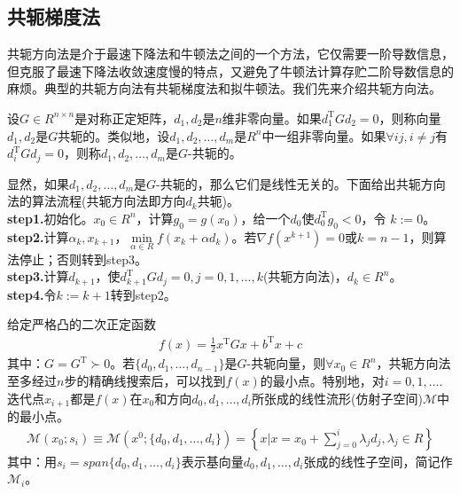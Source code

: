    \subsection{共轭梯度法}
        \par
        共轭方向法是介于最速下降法和牛顿法之间的一个方法，它仅需要一阶导数信息，但克服了最速下降法收敛速度慢的特点，又避免了牛顿法计算存贮二阶导数信息的麻烦。典型的共轭方向法有共轭梯度法和拟牛顿法。我们先来介绍共轭方向法。
        \par
        设$G \in R^{n \times n}$是对称正定矩阵，$d_1,d_2$是$n$维非零向量。如果$d_1^\mathrm{T}  G d_2 = 0$，则称向量$d_1,d_2$是$G$共轭的。类似地，设$d_1,d_2,\dots,d_m$是$R^n$中一组非零向量。如果$\forall ij,i \neq j$有$d_i^\mathrm{T} G d_j=0$，则称$d_1,d_2,\dots,d_m$是$G$-共轭的。
        \par
        显然，如果$d_1,d_2,\ldots,d_m$是$G$-共轭的，那么它们是线性无关的。下面给出共轭方向法的算法流程(共轭方向法即方向$d_k$共轭)。\\
        \textbf{step1.}初始化。$x_0\in R^n$，计算$g_0 = g(x_0)$，给一个$d_0$使$d_0^\mathrm{T}  g_0 <0$，令 $k:=0$。\\
        \textbf{step2.}计算${\alpha}_k,x_{k+1}$，$\mathop {\min} \limits_{\alpha \in R}f(x_k+\alpha d_k)$。若$
        \nabla f(x^{k+1})=0$或$k=n-1$，则算法停止；否则转到step3。\\
        \textbf{step3.}计算$d_{k+1}$，使$d_{k+1}^\mathrm{T}  G d_j=0,j=0,1,\ldots ,k$(共轭方向法)，$d_k \in R^n$。\\
        \textbf{step4.}令$k:=k+1$转到step2。
        \begin{lemma}[扩张子空间定理]
        给定严格凸的二次正定函数
        \begin{align*}
         f(x)=\frac 12 x^\mathrm{T} Gx+b^\mathrm{T} x+c
        \end{align*}
        其中：$G=G^\mathrm{T} \succ 0$。若$\{d_0,d_1,\ldots,d_{n-1}\}$是$G$-共轭向量，则$\forall x_0\in R^n$，共轭方向法至多经过$n$步的精确线搜索后，可以找到$f(x)$的最小点。特别地，对$i=0,1,\ldots.$迭代点$x_{i+1}$都是$f(x)$在$x_0$和方向$d_0,d_1,\ldots,d_i$所张成的线性流形(仿射子空间)$\mathcal{M}$中的最小点。
        \begin{align*}
         \mathcal{M}(x_0;s_i) \equiv \mathcal{M}(x^0;\{ d_0,d_1,\ldots,d_i\})=\left\{x \Big|x=x_0+\mathop {\sum} \limits_{j=0}^i{\lambda}_jd_j,{\lambda}_j \in R\right\}
        \end{align*}
        其中：用$s_i=span\{d_0,d_1,\ldots,d_i\}$表示基向量$d_0,d_1,\ldots,d_i$张成的线性子空间，简记作$\mathcal{M}_i$。
        \end{lemma}
